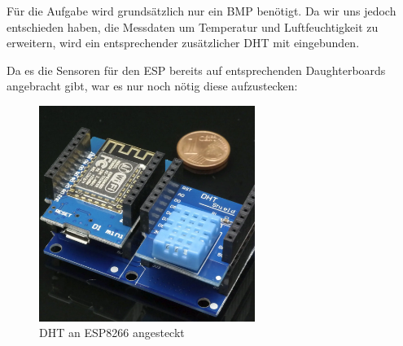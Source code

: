 Für die Aufgabe wird grundsätzlich nur ein BMP benötigt.
Da wir uns jedoch entschieden haben, die Messdaten um Temperatur und Luftfeuchtigkeit zu erweitern, 
wird ein entsprechender zusätzlicher DHT mit eingebunden.

Da es die Sensoren für den ESP bereits auf entsprechenden Daughterboards angebracht gibt,
war es nur noch nötig diese aufzustecken:

\begin{figure}[h]
	\centering
	\includegraphics[width=7cm]{images/esp_dht.png}
	\caption[dht_an_esp]{DHT an ESP8266 angesteckt}
	\label{fig:dht_an_esp}
\end{figure}
